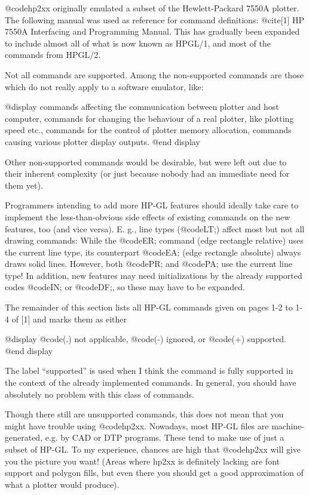 @code{hp2xx} originally emulated a subset of the Hewlett-Packard 7550A plotter.
The following manual was used as reference for command definitions:
@cite{[1] HP 7550A Interfacing and Programming Manual}. This has gradually
been expanded to include almost all of what is now known as HPGL/1, and
most of the commands from HPGL/2.

Not all commands are supported. Among the non-supported commands
are those which do not really apply to a software emulator, like:

@display
commands affecting the communication between plotter and host computer,
commands for changing the behaviour of a real plotter, like plotting speed etc.,
commands for the control of plotter memory allocation,
commands causing various plotter display outputs.
@end display

Other non-supported commands would be desirable, but were left out
due to their inherent complexity (or just because nobody had an immediate
need for them yet).

Programmers intending to add more HP-GL features should ideally take care to
implement the less-than-obvious side effects of existing commands on
the new features, too (and vice versa). E. g., line types (@code{LT;})
affect most but not all drawing commands: While the @code{ER;} command
(edge rectangle relative) uses the current line type, its counterpart
@code{EA;} (edge rectangle absolute) always draws solid lines. However,
both @code{PR;} and @code{PA;} use the current line type! In addition,
new features may need initializations by the already supported
codes @code{IN;} or @code{DF;}, so these may have to be expanded.

The remainder of this section lists all HP-GL commands given on
pages 1-2 to 1-4 of [1] and marks them as either

@display
      @code{(.)}  not applicable,
      @code{(-)}  ignored, or
      @code{(+)}  supported.
@end display

The label ``supported'' is used when I think the command is fully supported
in the context of the already implemented commands. In general,
you should have absolutely no problem with this class of commands.

Though there still are unsupported commands, this does not mean that
you might have trouble using @code{hp2xx}. Nowadays, most HP-GL files are
machine-generated, e.g. by CAD or DTP programs. These tend to make use
of just a subset of HP-GL. To my experience, chances are high
that @code{hp2xx} will give you the picture you want! (Areas where hp2xx
is definitely lacking are font support and polygon fills, but even there
you should get a good approximation of what a plotter would produce).


